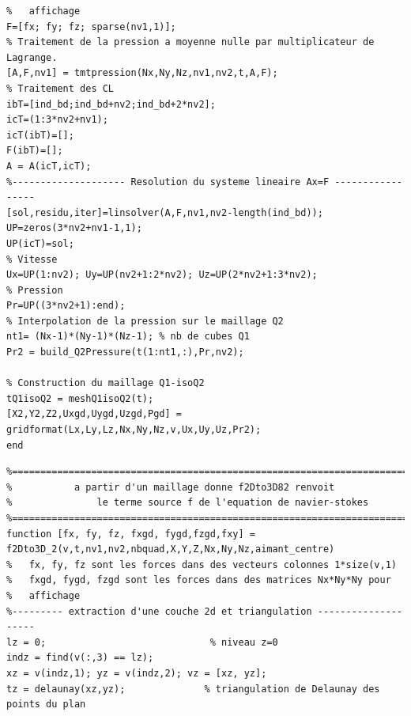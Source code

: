 \documentclass[a4paper,12pt,titlepage]{report}
\begin{document}
\begin{onehalfspace}
\begin{appendix}
\begin{verbatim}
%   affichage
F=[fx; fy; fz; sparse(nv1,1)];
% Traitement de la pression a moyenne nulle par multiplicateur de Lagrange.
[A,F,nv1] = tmtpression(Nx,Ny,Nz,nv1,nv2,t,A,F);
% Traitement des CL
ibT=[ind_bd;ind_bd+nv2;ind_bd+2*nv2];
icT=(1:3*nv2+nv1);
icT(ibT)=[];
F(ibT)=[];
A = A(icT,icT);
%-------------------- Resolution du systeme lineaire Ax=F -----------------
[sol,residu,iter]=linsolver(A,F,nv1,nv2-length(ind_bd));
UP=zeros(3*nv2+nv1-1,1);
UP(icT)=sol;
% Vitesse
Ux=UP(1:nv2); Uy=UP(nv2+1:2*nv2); Uz=UP(2*nv2+1:3*nv2);
% Pression
Pr=UP((3*nv2+1):end);
% Interpolation de la pression sur le maillage Q2
nt1= (Nx-1)*(Ny-1)*(Nz-1); % nb de cubes Q1
Pr2 = build_Q2Pressure(t(1:nt1,:),Pr,nv2);

% Construction du maillage Q1-isoQ2
tQ1isoQ2 = meshQ1isoQ2(t); 
[X2,Y2,Z2,Uxgd,Uygd,Uzgd,Pgd] = gridformat(Lx,Ly,Lz,Nx,Ny,Nz,v,Ux,Uy,Uz,Pr2);
end
\end{verbatim}

\begin{verbatim}
%==========================================================================
%     		a partir d'un maillage donne f2Dto3D82 renvoit 
%   			le terme source f de l'equation de navier-stokes
%==========================================================================
function [fx, fy, fz, fxgd, fygd,fzgd,fxy] = f2Dto3D_2(v,t,nv1,nv2,nbquad,X,Y,Z,Nx,Ny,Nz,aimant_centre)
%   fx, fy, fz sont les forces dans des vecteurs colonnes 1*size(v,1)
%   fxgd, fygd, fzgd sont les forces dans des matrices Nx*Ny*Ny pour
%   affichage
%--------- extraction d'une couche 2d et triangulation --------------------
lz = 0;                             % niveau z=0
indz = find(v(:,3) == lz);
xz = v(indz,1); yz = v(indz,2); vz = [xz, yz];
tz = delaunay(xz,yz);              % triangulation de Delaunay des points du plan 


\end{verbatim}
\end{appendix}
\end{onehalfspace}
\end{document}
